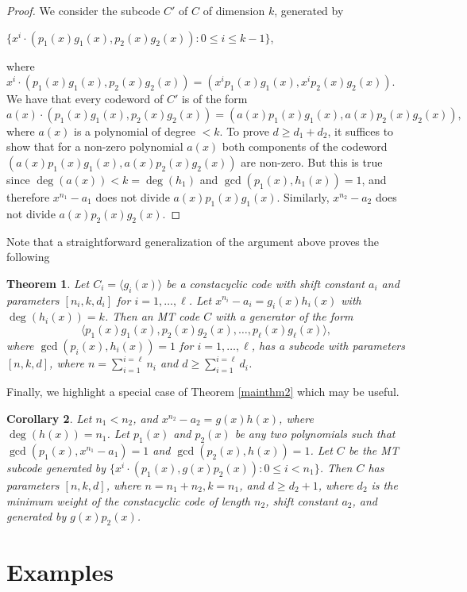 \documentclass[preprint,12pt]{elsarticle}
\newtheorem{Theorem}{Theorem}[section]
\newtheorem{Corollary}[Theorem]{Corollary}
\begin{document}
\begin{proof}
   We consider the subcode $C'$ of $C$ of dimension $k$, generated by 
   \begin{center}
   $\{x^i\cdot (p_1(x)g_1(x), p_2(x)g_2(x)): 0\leq i\leq k-1\}$,
   \end{center}
 where $x^i\cdot (p_1(x)g_1(x), p_2(x)g_2(x))=(x^i p_1(x)g_1(x), x^i p_2(x)g_2(x))$. We have that every codeword of $C'$ is of the form \[a(x)\cdot (p_1(x)g_1(x),p_2(x)g_2(x))=(a(x)p_1(x)g_1(x),a(x)p_2(x)g_2(x)),\] where $a(x)$ is a polynomial of degree $<k$. To prove $d\geq d_1+d_2$, it suffices to show that for a non-zero polynomial $a(x)$ both components of the codeword $(a(x)p_1(x)g_1(x),a(x)p_2(x)g_2(x))$ are non-zero. But this is true since $\deg(a(x))<k=\deg(h_1)$ and $\gcd(p_1(x),h_1(x))=1$, and therefore $x^{n_1}-a_1$ does not divide $a(x)p_1(x)g_1(x)$. Similarly, $x^{n_2}-a_2$ does not divide $a(x)p_2(x)g_2(x)$. 
\end{proof}

Note that a straightforward generalization of the argument above proves the following

\begin{Theorem}
Let $C_i=\langle g_i(x)\rangle$ be a constacyclic code with shift constant $a_i$ and parameters $[n_i,k,d_i]$ for $i=1,\dots, \ell$. Let $x^{n_i}-a_i=g_i(x)h_i(x)$ with $\deg(h_i(x))=k$. Then an MT code $C$ with a generator of the form 
\[\langle p_1(x)g_1(x),p_2(x)g_2(x),\dots,p_\ell(x)g_\ell(x)\rangle,\] 
where $\gcd(p_i(x),h_i(x))=1$ for $i=1,\dots, \ell$, has a subcode with parameters $[n,k,d]$, where 
$\displaystyle{n=\sum_{i=1}^{i=\ell} n_i}$ and $\displaystyle{d\geq \sum_{i=1}^{i=\ell}d_i}$. 
\end{Theorem}

Finally, we highlight a special case of Theorem \ref{mainthm2} which may be useful. 

\begin{Corollary}\label{gcd1}
Let $n_1<n_2$,  and $x^{n_2}-a_2=g(x)h(x)$, where $\deg(h(x))=n_1$. Let $p_1(x)$ and $p_2(x)$ be any two polynomials such that $\gcd(p_1(x),x^{n_1}-a_1)=1$ and  $\gcd(p_2(x),h(x))=1$. Let $C$ be the MT subcode generated by $\{x^i\cdot (p_1(x), g(x)p_2(x)): 0\leq i < n_1\}$. Then $C$ has parameters $[n,k,d]$, where $n=n_1+n_2, k=n_1$, and $d\geq d_2+1$, where $d_2$ is the minimum weight of the constacyclic code of length $n_2$, shift constant $a_2$, and generated by  $g(x)p_2(x)$.
\end{Corollary}

\section{Examples}
\end{document}
